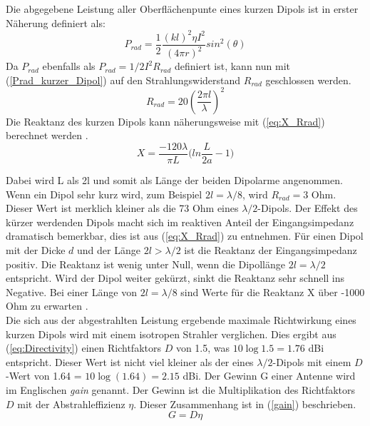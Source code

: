 Die abgegebene Leistung aller Oberflächenpunte eines kurzen Dipols ist in erster Näherung definiert als:
\begin{equation}
P_{rad}=\dfrac{1}{2}\dfrac{(kl)^{2}\eta I^{2}}{(4\pi r)^{2}}sin^{2}(\theta)
\label{Prad_kurzer_Dipol}
\end{equation}
Da $P_{rad}$ ebenfalls als $P_{rad}=1/2I^{2}R_{rad}$ definiert ist, kann nun mit (\ref{Prad_kurzer_Dipol}) auf den  Strahlungswiderstand $R_{rad}$ geschlossen werden.
\begin{equation}
R_{rad}=20 (\dfrac{2 \pi l}{\lambda})^{2}
\label{R_rad_kurzer_Dipol}
\end{equation}
Die Reaktanz des kurzen Dipols kann näherungsweise mit (\ref{eq:X_Rrad}) berechnet werden \cite{Antenne_Theory_Xant}.
\begin{equation}\label{eq:X_Rrad}
X=\dfrac{-120\lambda}{\pi L}\biggl(ln\dfrac{L}{2a}-1\biggr)
\end{equation}

Dabei wird L als 2l und somit als Länge der beiden Dipolarme angenommen.
Wenn ein Dipol sehr kurz wird, zum Beispiel $2l=\lambda/8$,  wird $R_{rad} = 3$ Ohm. Dieser Wert ist merklich kleiner als die 73 Ohm eines $\lambda/2$-Dipols. Der Effekt des kürzer werdenden Dipols macht sich im  reaktiven Anteil der Eingangsimpedanz dramatisch bemerkbar, dies ist aus (\ref{eq:X_Rrad}) zu entnehmen. Für einen Dipol mit der Dicke $d$ und der Länge $2l>\lambda/2$ ist die Reaktanz der Eingangsimpedanz positiv. Die Reaktanz ist wenig unter Null, wenn die Dipollänge $2l=\lambda/2$ entspricht. Wird der Dipol weiter gekürzt,  sinkt die Reaktanz sehr schnell ins Negative. Bei einer Länge von $2l=\lambda/8$ sind Werte für die Reaktanz X über -1000 Ohm zu erwarten \cite{elliott1981antenna}. \\
Die sich aus der abgestrahlten Leistung ergebende maximale Richtwirkung eines kurzen Dipols wird mit einem isotropen Strahler verglichen. Dies ergibt aus (\ref{eq:Directivity}) einen Richtfaktors $D$ von 1.5, was $10\log{1.5}=1.76$ dBi entspricht. Dieser Wert ist nicht viel kleiner als der eines $\lambda/2$-Dipols mit einem $D$-Wert von 1.64 = $10\log{(1.64)}=2.15$ dBi. Der Gewinn G einer Antenne wird im Englischen \textit{gain} genannt. Der Gewinn ist die Multiplikation des Richtfaktors $D$ mit der Abstrahleffizienz $\eta$. Dieser Zusammenhang ist in (\ref{gain}) beschrieben.
\begin{equation}\label{gain}
G=D\eta
\end{equation}





